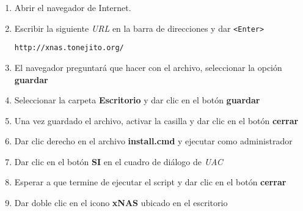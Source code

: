 {
\linespread{0.1}
\begin{enumerate}


  \item Abrir el navegador de Internet.


  \item Escribir la siguiente \textit{URL} en la barra de direcciones y dar \texttt{<Enter>}

    \texttt{http://xnas.tonejito.org/}


  \item El navegador preguntar\'{a} que hacer con el archivo, seleccionar la opci\'{o}n \textbf{guardar}


  \item Seleccionar la carpeta \textbf{Escritorio} y dar clic en el bot\'{o}n \textbf{guardar}


  \item Una vez guardado el archivo, activar la casilla y dar clic en el bot\'{o}n \textbf{cerrar}


  \item Dar clic derecho en el archivo \textbf{install.cmd} y ejecutar como administrador


  \item Dar clic en el bot\'{o}n \textbf{SI} en el cuadro de di\'{a}logo de \textit{UAC}


  \item Esperar a que termine de ejecutar el script y dar clic en el bot\'{o}n \textbf{cerrar}


  \item Dar doble clic en el icono \textbf{xNAS} ubicado en el escritorio



\end{enumerate}}
